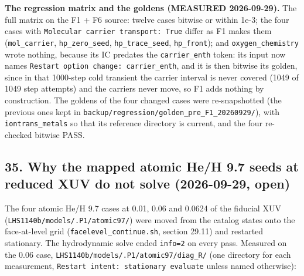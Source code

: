 \documentclass[english,a4paper]{my_memo}
\begin{document}
\textbf{The regression matrix and the goldens (MEASURED 2026-09-29).} The full
matrix on the F1 + F6 source: twelve cases bitwise or within 1e-3; the four
cases with \texttt{Molecular\ carrier\ transport:\ True} differ as F1 makes them
(\texttt{mol\_carrier}, \texttt{hp\_zero\_seed}, \texttt{hp\_trace\_seed}, \texttt{hp\_front}); and
\texttt{oxygen\_chemistry} wrote nothing, because its IC predates the \texttt{carrier\_enth}
token: its input now names \texttt{Restart\ option\ change:\ carrier\_enth}, and it is
then bitwise its golden, since in that 1000-step cold transient the carrier
interval is never covered (1049 of 1049 step attempts) and the carriers never
move, so F1 adds nothing by construction. The goldens of the four changed
cases were re-snapshotted (the previous ones kept in
\texttt{backup/regression/golden\_pre\_F1\_20260929/}), with \texttt{iontrans\_metals} so that
its reference directory is current, and the four re-checked bitwise PASS.

\subsection{35. Why the mapped atomic He/H 9.7 seeds at reduced XUV do not solve (2026-09-29, open)}\label{35-why-the-mapped-atomic-heh-97-seeds-at-reduced-xuv-do-not-solve-2026-09-29-open}

The four atomic He/H 9.7 cases at 0.01, 0.06 and 0.0624 of the fiducial XUV
(\texttt{LHS1140b/models/.P1/atomic97/}) were moved from the catalog states onto the
face-at-level grid (\texttt{facelevel\_continue.sh}, section 29.11) and restarted
stationary. The hydrodynamic solve ended \texttt{info=2} on every pass. Measured on
the 0.06 case, \texttt{LHS1140b/models/.P1/atomic97/diag\_R/} (one directory for each
measurement, \texttt{Restart\ intent:\ stationary\ evaluate} unless named otherwise):
\end{document}
